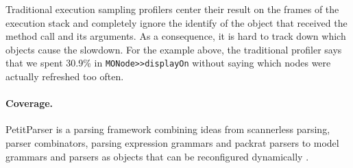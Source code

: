 \documentclass[runningheads]{llncs}
\newcommand{\ct}{\lstinline[backgroundcolor=\color{white},basicstyle=\footnotesize\ttfamily]}
\newcommand{\ab}[1]{\nb{Alexandre}{blue}{#1}}
\newcommand{\lr}[1]{\nb{Lukas}{orange}{#1}}
\newcommand{\jr}[1]{\nb{Jorge}{cyan}{#1}}
\begin{document}
Traditional execution sampling profilers center their result on the frames of the execution stack and completely ignore the identify of the object that received the method call and its arguments. As a consequence, it is hard to track down which objects cause the slowdown. For the example above, the traditional profiler says that we spent 30.9\% in \ct{MONode>>displayOn} without saying which nodes were actually refreshed too often.


\paragraph{Coverage.} 
PetitParser is a parsing framework combining ideas from scannerless parsing, parser combinators, parsing expression grammars and packrat parsers to model grammars and parsers as objects that can be reconfigured dynamically \cite{Reng10c}. %
\end{document}
